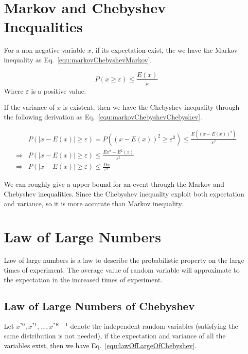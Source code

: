 \documentclass[runningheads,openany]{xhlPaper}
\begin{document}
\section{Markov and Chebyshev Inequalities}
For a non-negative variable $x$, if its expectation exist, the we have the Markov inequality as Eq.~\ref{equ:markovChebyshevMarkov}.

\begin{equation}
\label{equ:markovChebyshevMarkov}
P\left( {x \ge \varepsilon } \right) \le \frac{{E\left( x \right)}}{\varepsilon }
\end{equation}
Where $\varepsilon$ is a positive value.

If the variance of $x$ is existent, then we have the Chebyshev inequality through the following derivation as Eq.~\ref{equ:markovChebyshevChebyshev}.

\begin{equation}
\label{equ:markovChebyshevChebyshev}
\begin{aligned}
&P\left( {|x - E\left( x \right)| \ge \varepsilon } \right) = P\left( {{{\left( {x - E\left( x \right)} \right)}^2} \ge {\varepsilon ^2}} \right) \le \frac{{E\left( {{{\left( {x - E\left( x \right)} \right)}^2}} \right)}}{{{\varepsilon ^2}}}\\
 \Rightarrow &P\left( {|x - E\left( x \right)| \ge \varepsilon } \right) \le \frac{{E{x^2} - {E^2}\left( x \right)}}{{{\varepsilon ^2}}}\\
 \Rightarrow &P\left( {|x - E\left( x \right)| \ge \varepsilon } \right) \le \frac{{Dx}}{{{\varepsilon ^2}}}
\end{aligned}
\end{equation}

We can roughly give a upper bound for an event through the Markov and Chebyshev inequalities. Since the Chebyshev inequality exploit both expectation and variance, so it is more accurate than Markov inequality.

\section{Law of Large Numbers}
Law of large numbers is a law to describe the probabilistic property on the large times of experiment. The average value of random variable will approximate to the expectation in the increased times of experiment.

\subsection{Law of Large Numbers of Chebyshev}
Let $x^{*0}, x^{*1}, ... , x^{*K-1}$ denote the independent random variables (satisfying the same distribution is not needed), if the expectation and variance of all the variables exist, then we have Eq.~\ref{equ:lawOfLargeOfChebyshev}. 
\end{document}
